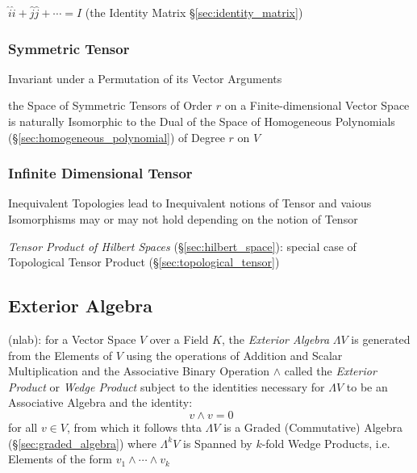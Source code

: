 {{$\hat{i}\hat{i} + \hat{j}\hat{j} + \cdots = I$ (the Identity Matrix
\S\ref{sec:identity_matrix})



\subsubsection{Symmetric Tensor}\label{sec:symmetric_tensor}

Invariant under a Permutation of its Vector Arguments

the Space of Symmetric Tensors of Order $r$ on a Finite-dimensional Vector
Space is naturally Isomorphic to the Dual of the Space of Homogeneous
Polynomials (\S\ref{sec:homogeneous_polynomial}) of Degree $r$ on $V$



\subsubsection{Infinite Dimensional Tensor}
\label{sec:infinite_dimensional_tensor}

Inequivalent Topologies lead to Inequivalent notions of Tensor and
vaious Isomorphisms may or may not hold depending on the notion of
Tensor

\emph{Tensor Product of Hilbert Spaces} (\S\ref{sec:hilbert_space}):
special case of Topological Tensor Product
(\S\ref{sec:topological_tensor})



\subsection{Exterior Algebra}\label{sec:exterior_algebra}

(nlab): for a Vector Space $V$ over a Field $K$, the \emph{Exterior Algebra}
$\Lambda{V}$ is generated from the Elements of $V$ using the operations of
Addition and Scalar Multiplication and the Associative Binary Operation $\wedge$
called the \emph{Exterior Product} or \emph{Wedge Product} subject to the
identities necessary for $\Lambda{V}$ to be an Associative Algebra and the
identity:
\[
  v \wedge v = 0
\]
for all $v \in V$, from which it follows thta $\Lambda{V}$ is a Graded
(Commutative) Algebra (\S\ref{sec:graded_algebra}) where $\Lambda^k{V}$ is
Spanned by $k$-fold Wedge Products, i.e. Elements of the form $v_1 \wedge \cdots
\wedge v_k$

}}
